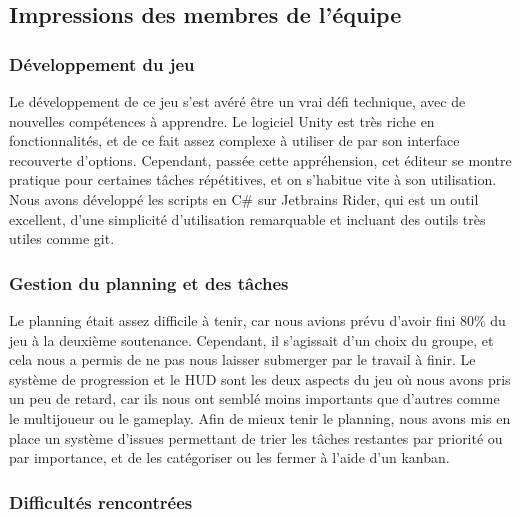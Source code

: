 \subsection{Impressions des membres de l'équipe}

    \subsubsection{Développement du jeu}

        Le développement de ce jeu s'est avéré être un vrai défi technique, avec de nouvelles compétences à apprendre. 
        Le logiciel Unity est très riche en fonctionnalités, et de ce fait assez complexe à utiliser de par son interface 
        recouverte d'options. Cependant, passée cette appréhension, cet éditeur se montre pratique pour certaines tâches répétitives, et 
        on s'habitue vite à son utilisation. Nous avons développé les scripts en C\# sur Jetbrains Rider, qui est un outil 
        excellent, d'une simplicité d'utilisation remarquable et incluant des outils très utiles comme git. 


    \subsubsection{Gestion du planning et des tâches}

        Le planning était assez difficile à tenir, car nous avions prévu d'avoir fini 80\% du jeu à la deuxième soutenance. 
        Cependant, il s'agissait d'un choix du groupe, et cela nous a permis de ne pas nous laisser submerger par le travail 
        à finir. Le système de progression et le HUD sont les deux aspects du jeu où nous avons pris un peu de retard, car ils nous ont 
        semblé moins importants que d'autres comme le multijoueur ou le gameplay. Afin de mieux tenir le planning, nous avons mis en place 
        un système d'issues permettant de trier les tâches restantes par priorité ou par importance, et de les catégoriser ou les fermer à l'aide 
        d'un kanban. 


    \subsubsection{Difficultés rencontrées}

